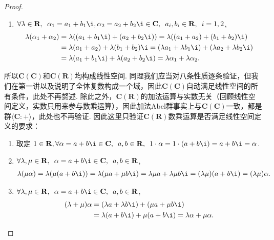 \begin{proof}
\begin{enumerate}
        \item $\forall \lambda \in \mathbf{R},\enspace \alpha_1 = a_1+b_1\i, \alpha_2 = a_2+b_2\i \in \mathbf{C},\enspace a_i, b_i \in \mathbf{R},\enspace i = 1, 2$,
              \begin{align*}
                  \lambda(\alpha_1+\alpha_2)
                   & = \lambda((a_1+b_1\i)+(a_2+b_2\i)) = \lambda((a_1+a_2)+(b_1+b_2)\i)                             \\
                   & = \lambda(a_1+a_2)+\lambda(b_1+b_2)\i = (\lambda a_1+\lambda b_1\i)+(\lambda a_2+\lambda b_2\i) \\
                   & = \lambda(a_1+b_1\i)+\lambda(a_2+b_2\i) = \lambda \alpha_1 + \lambda \alpha_2.
              \end{align*}
    \end{enumerate}
    所以$\mathbf{C}(\mathbf{C})$和$\mathbf{C}(\mathbf{R})$均构成线性空间. 同理我们应当对八条性质逐条验证，但我们在第一讲以及说明了全体复数构成一个域，因此$\mathbf{C}(\mathbf{C})$自动满足线性空间的所有条件，此处不再赘述. 除此之外，$\mathbf{C}(\mathbf{R})$的加法运算与实数无关（回顾线性空间定义，实数只用来参与数乘运算），因此加法Abel群事实上与$\mathbf{C}(\mathbf{C})$一致，都是群$\langle \mathbf{C}\colon+\rangle$，此处也不再验证. 因此这里只验证$\mathbf{C}(\mathbf{R})$数乘运算是否满足线性空间定义的要求：
    \begin{enumerate}
        \item 取定 $1 \in \mathbf{R}, \forall \alpha = a+b\i \in \mathbf{C},\enspace a, b \in \mathbf{R},\enspace 1 \cdot \alpha = 1 \cdot (a+b\i) = a+b\i = \alpha$.

        \item $\forall \lambda, \mu \in \mathbf{R},\enspace \alpha = a+b\i \in \mathbf{C},\enspace a, b \in \mathbf{R}$,
              \begin{align*}
                  \lambda(\mu \alpha) = \lambda(\mu (a+b\i)) = \lambda(\mu a+\mu b\i) = \lambda \mu a + \lambda \mu b\i = (\lambda \mu)(a+b\i) = (\lambda \mu)\alpha.
              \end{align*}

        \item $\forall \lambda, \mu \in \mathbf{R},\enspace \alpha = a+b\i \in \mathbf{C},\enspace a, b \in \mathbf{R}$,
              \begin{align*}
                  (\lambda + \mu) \alpha
                   & = (\lambda a + \lambda b\i) + (\mu a + \mu b\i)            \\
                   & = \lambda(a+b\i)+\mu(a+b\i) = \lambda \alpha + \mu \alpha.
              \end{align*}


\end{enumerate}
\end{proof}
